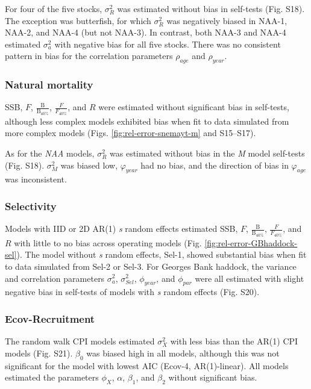 \documentclass[]{article}
\begin{document}
For four of the five stocks, \(\sigma^2_R\) was estimated without bias
in self-tests (Fig. S18). The exception was butterfish, for which
\(\sigma^2_R\) was negatively biased in NAA-1, NAA-2, and NAA-4 (but not
NAA-3). In contrast, both NAA-3 and NAA-4 estimated \(\sigma^2_a\) with
negative bias for all five stocks. There was no consistent pattern in
bias for the correlation parameters \(\rho_{age}\) and \(\rho_{year}\).

\hypertarget{natural-mortality}{%
\subsubsection{Natural mortality}\label{natural-mortality}}

SSB, \(F\), \(\frac{\text{B}}{\text{B}_{40\%}}\),
\(\frac{F}{F_{40\%}}\), and \(R\) were estimated without significant
bias in self-tests, although less complex models exhibited bias when fit
to data simulated from more complex models (Figs.
\ref{fig:rel-error-snemayt-m} and S15--S17).

As for the \emph{NAA} models, \(\sigma^2_R\) was estimated without bias
in the \emph{M} model self-tests (Fig. S18). \(\sigma^2_M\) was biased
low, \(\varphi_{year}\) had no bias, and the direction of bias in
\(\varphi_{age}\) was inconsistent.

\hypertarget{selectivity}{%
\subsubsection{Selectivity}\label{selectivity}}

Models with IID or 2D AR(1) \emph{s} random effects estimated SSB,
\(F\), \(\frac{\text{B}}{\text{B}_{40\%}}\), \(\frac{F}{F_{40\%}}\), and
\(R\) with little to no bias across operating models (Fig.
\ref{fig:rel-error-GBhaddock-sel}). The model without \emph{s} random
effects, Sel-1, showed substantial bias when fit to data simulated from
Sel-2 or Sel-3. For Georges Bank haddock, the variance and correlation
parameters \(\sigma^2_a\), \(\sigma^2_{Sel}\), \(\phi_{year}\), and
\(\phi_{par}\) were all estimated with slight negative bias in
self-tests of models with \emph{s} random effects (Fig. S20).

\hypertarget{ecov-recruitment}{%
\subsubsection{Ecov-Recruitment}\label{ecov-recruitment}}

The random walk CPI models estimated \(\sigma^2_X\) with less bias than
the AR(1) CPI models (Fig. S21). \(\beta_0\) was biased high in all
models, although this was not significant for the model with lowest AIC
(Ecov-4, AR(1)-linear). All models estimated the parameters \(\phi_X\),
\(\alpha\), \(\beta_1\), and \(\beta_2\) without significant bias.
\end{document}
